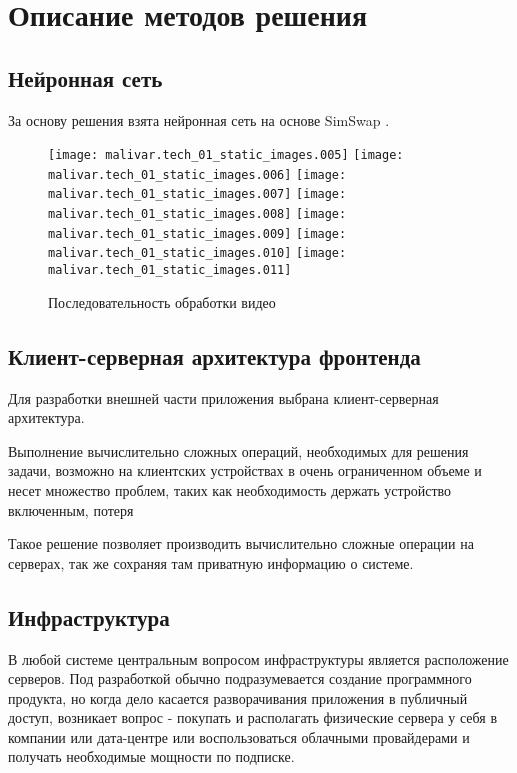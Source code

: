 
\section{Описание методов решения}

\subsection{Нейронная сеть}

За основу решения взята нейронная сеть на основе SimSwap \cite{DBLP:conf/mm/ChenCNG20}.

\noindent

\begin{figure}
	\texttt{[image: malivar.tech\_01\_static\_images.005]}
	\texttt{[image: malivar.tech\_01\_static\_images.006]}
	\texttt{[image: malivar.tech\_01\_static\_images.007]}
	\texttt{[image: malivar.tech\_01\_static\_images.008]}
	\texttt{[image: malivar.tech\_01\_static\_images.009]}
	\texttt{[image: malivar.tech\_01\_static\_images.010]}
	\texttt{[image: malivar.tech\_01\_static\_images.011]}
	\caption{Последовательность обработки видео}
\end{figure}

\subsection{Клиент-серверная архитектура фронтенда}

Для разработки внешней части приложения выбрана клиент-серверная архитектура.

Выполнение вычислительно сложных операций, необходимых для решения задачи, возможно на клиентских устройствах в очень ограниченном объеме и несет множество проблем, таких как необходимость держать устройство включенным, потеря

Такое решение позволяет производить вычислительно сложные операции на серверах, так же сохраняя там приватную информацию о системе.


\subsection{Инфраструктура}

В любой системе центральным вопросом инфраструктуры является расположение серверов. Под разработкой обычно подразумевается создание программного продукта, но когда дело касается разворачивания приложения в публичный доступ, возникает вопрос - покупать и располагать физические сервера у себя в компании или дата-центре или воспользоваться облачными провайдерами и получать необходимые мощности по подписке.

